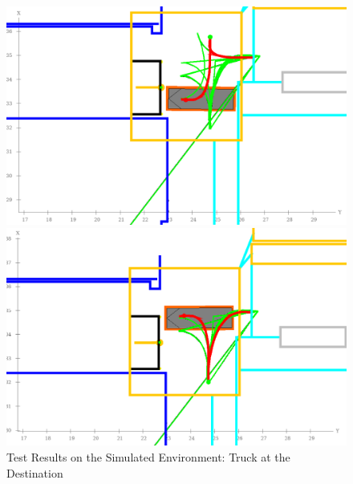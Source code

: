 \begin{figure}[H]
    \centering
    \begin{minipage}{0.45\textwidth}
        \centering
        \includegraphics[width=\linewidth]{images/Chap2/Pattern_spline_simulation_1.png} %
    \end{minipage}
    \begin{minipage}{0.45\textwidth}
        \centering
        \includegraphics[width=\linewidth]{images/Chap2/Pattern_spline_simulation_2.png} %
    \end{minipage}
    \caption{Test Results on the Simulated Environment: Truck at the Destination}
    \label{Test_Simu}
\end{figure}



